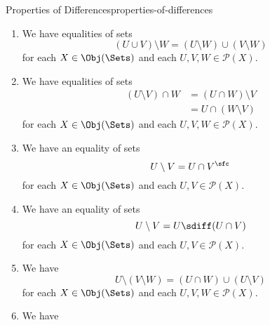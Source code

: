 \begin{proposition}{Properties of Differences}{properties-of-differences}
\begin{enumerate}
            \begin{align*}
                U\setminus(V\cup W) &= (U\cup W)\setminus(V\cup W)\\
                                    &= (U\setminus V)\setminus W\\
                                    &= (U\setminus W)\setminus V
            \end{align*}
            for each $X\in\Obj(\Sets)$ and each $U,V,W\in\mathcal{P}(X)$.
        \item\label{properties-of-differences-interaction-with-unions-4}We have equalities of sets
            \[%
                (U\cup V)\setminus W%
                =%
                (U\setminus W)\cup(V\setminus W)%
            \]%
            for each $X\in\Obj(\Sets)$ and each $U,V,W\in\mathcal{P}(X)$.
        \item\label{properties-of-differences-interaction-with-intersections}We have equalities of sets
            \begin{align*}
                (U\setminus V)\cap W &= (U\cap W)\setminus V\\
                                     &= U\cap(W\setminus V)
            \end{align*}
            for each $X\in\Obj(\Sets)$ and each $U,V,W\in\mathcal{P}(X)$.
        \item\label{properties-of-differences-interaction-with-complements}We have an equality of sets
            \[
                U\setminus V%
                =%
                U\cap V^{\sfc}%
            \]%
            for each $X\in\Obj(\Sets)$ and each $U,V\in\mathcal{P}(X)$.
        \item\label{properties-of-differences-interaction-with-symmetric-differences}We have an equality of sets
            \[
                U\setminus V%
                =%
                U\sdiff(U\cap V)%
            \]%
            for each $X\in\Obj(\Sets)$ and each $U,V\in\mathcal{P}(X)$.
        \item\label{properties-of-differences-triple-differences}We have
            \[
                U\setminus(V\setminus W)%
                =%
                (U\cap W)\cup(U\setminus V)%
            \]%
            for each $X\in\Obj(\Sets)$ and each $U,V,W\in\mathcal{P}(X)$.
        \item\label{properties-of-differences-left-annihilation}We have

\end{enumerate}
\end{proposition}

